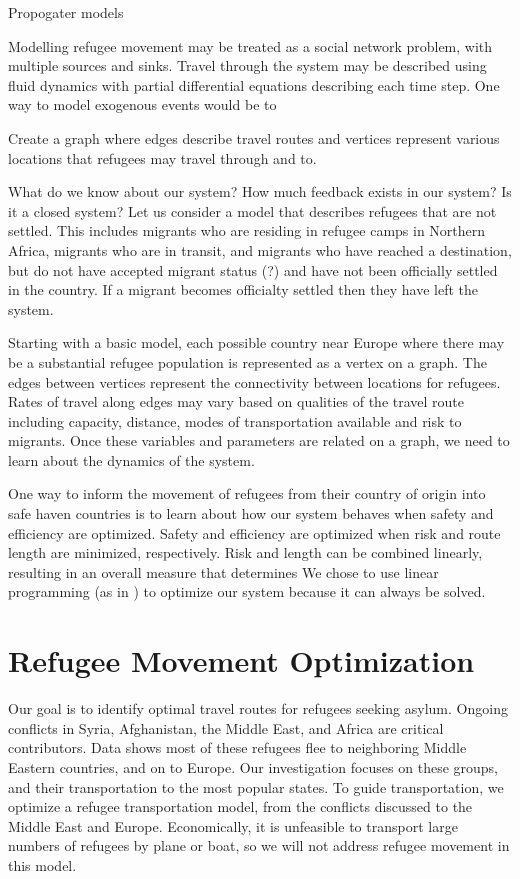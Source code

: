 \documentclass{article}
\begin{document}
\begin{enumerate}
    Propogater models

    Modelling refugee movement may be treated as a social network problem, with multiple sources and sinks. Travel through the system may be described using fluid dynamics with partial differential equations describing each time step. One way to model exogenous events would be to 

    Create a graph where edges describe travel routes and vertices represent various locations that refugees may travel through and to.

    What do we know about our system?
    How much feedback exists in our system? Is it a closed system? 
    Let us consider a model that describes refugees that are not settled. This includes migrants who are residing in refugee camps in Northern Africa, migrants who are in transit, and migrants who have reached a destination, but do not have accepted migrant status (?) and have not been officially settled in the country. If a migrant becomes officialty settled then they have left the system. 

    Starting with a basic model, each possible country near Europe where there may be a substantial refugee population is represented as a vertex on a graph. The edges between vertices represent the connectivity between locations for refugees. Rates of travel along edges may vary based on qualities of the travel route including capacity, distance, modes of transportation available and risk to migrants. Once these variables and parameters are related on a graph, we need to learn about the dynamics of the system.

    One way to inform the movement of refugees from their country of origin into safe haven countries is to learn about how our system behaves when safety and efficiency are optimized. Safety and efficiency are optimized when risk and route length are minimized, respectively. Risk and length can be combined linearly, resulting in an overall measure that determines We chose to use linear programming (as in \cite{bertsekas}) to optimize our system because it can always be solved. 


\section{Refugee Movement Optimization}

Our goal is to identify optimal travel routes for refugees seeking asylum. Ongoing conflicts in Syria, Afghanistan, the Middle East, and Africa are critical contributors\cite{refugeefactsheet}. Data shows most of these refugees flee to neighboring Middle Eastern countries, and on to Europe\cite{refugeefactsheet}. Our investigation focuses on these groups, and their transportation to the most popular states. To guide transportation, we optimize a refugee transportation model, from the conflicts discussed to the Middle East and Europe. Economically, it is unfeasible to transport large numbers of refugees by plane or boat, so we will not address refugee movement in this model.


\end{enumerate}
\end{document}
